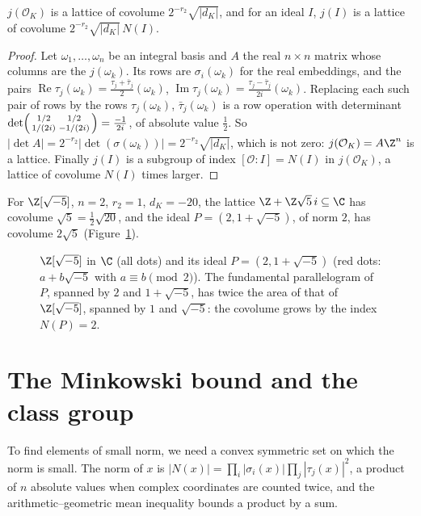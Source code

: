 \begin{proposition}\label{prop:covol}
$j(\mathcal O_K)$ is a lattice of covolume $2^{-r_2}\sqrt{|d_K|}$, and for an ideal $I$, $j(I)$ is a lattice of covolume
$2^{-r_2}\sqrt{|d_K|}\,N(I)$.
\end{proposition}
\begin{proof}
Let $\omega_1,\dots,\omega_n$ be an integral basis and $A$ the real $n\times n$ matrix whose columns are the
$j(\omega_k)$. Its rows are $\sigma_i(\omega_k)$ for the real embeddings, and the pairs $\operatorname{Re}\tau_j(\omega_k)
=\frac{\tau_j+\bar\tau_j}2(\omega_k)$, $\operatorname{Im}\tau_j(\omega_k)=\frac{\tau_j-\bar\tau_j}{2i}(\omega_k)$. Replacing
each such pair of rows by the rows $\tau_j(\omega_k)$, $\bar\tau_j(\omega_k)$ is a row operation with determinant
$\det\begin{psmallmatrix}1/2&1/2\\1/(2i)&-1/(2i)\end{psmallmatrix}=\frac{-1}{2i}$, of absolute value $\frac12$. So
$|\det A|=2^{-r_2}|\det(\sigma(\omega_k))|=2^{-r_2}\sqrt{|d_K|}$, which is not zero: $j(\mathcal O_K)=A\Z^n$ is a
lattice. Finally $j(I)$ is a subgroup of index $[\mathcal O:I]=N(I)$ in $j(\mathcal O_K)$, a lattice of covolume
$N(I)$ times larger.
\end{proof}

For $\Z[\sqrt{-5}]$, $n=2$, $r_2=1$, $d_K=-20$, the lattice $\Z+\Z\sqrt5\,i\subseteq\C$ has covolume $\sqrt5=\frac12\sqrt{20}$,
and the ideal $P=(2,1+\sqrt{-5})$, of norm $2$, has covolume $2\sqrt5$ (Figure~\ref{fig:ideal3}).

\begin{figure}[ht]
\centering
{}
\caption{$\Z[\sqrt{-5}]$ in $\C$ (all dots) and its ideal $P=(2,1+\sqrt{-5})$ (red dots: $a+b\sqrt{-5}$ with $a\equiv b
\pmod 2$). The fundamental parallelogram of $P$, spanned by $2$ and $1+\sqrt{-5}$, has twice the area of that of $\Z[\sqrt{-5}]$,
spanned by $1$ and $\sqrt{-5}$: the covolume grows by the index $N(P)=2$.}
\label{fig:ideal3}
\end{figure}

\section{The Minkowski bound and the class group}

To find elements of small norm, we need a convex symmetric set on which the norm is small. The norm of $x$ is
$|N(x)|=\prod_i|\sigma_i(x)|\prod_j|\tau_j(x)|^2$, a product of $n$ absolute values when complex coordinates are counted
twice, and the arithmetic--geometric mean inequality bounds a product by a sum.

